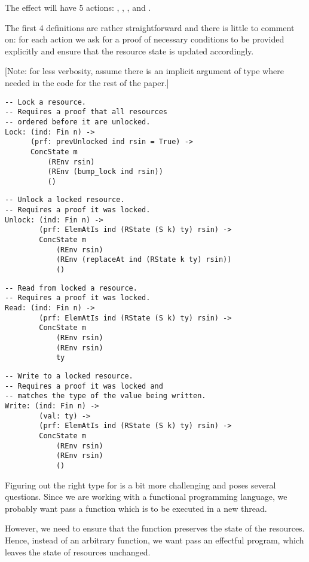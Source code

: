 The effect will have 5 actions: , , ,
 and .

The first 4 definitions are rather straightforward and there is little to
comment on: for each action we ask for a proof of necessary conditions to be
provided explicitly and ensure that the resource state is updated accordingly.

[Note: for less verbosity, assume there is an implicit argument  of
type  where needed in the code for the rest of the
paper.]

\begin{BVerbatim}
-- Lock a resource.
-- Requires a proof that all resources
-- ordered before it are unlocked.
Lock: (ind: Fin n) ->
      (prf: prevUnlocked ind rsin = True) ->
      ConcState m
          (REnv rsin)
          (REnv (bump_lock ind rsin))
          ()
\end{BVerbatim}

\begin{BVerbatim}
-- Unlock a locked resource.
-- Requires a proof it was locked.
Unlock: (ind: Fin n) ->
        (prf: ElemAtIs ind (RState (S k) ty) rsin) ->
        ConcState m
            (REnv rsin)
            (REnv (replaceAt ind (RState k ty) rsin))
            ()
\end{BVerbatim}

\begin{BVerbatim}
-- Read from locked a resource.
-- Requires a proof it was locked.
Read: (ind: Fin n) ->
        (prf: ElemAtIs ind (RState (S k) ty) rsin) ->
        ConcState m
            (REnv rsin)
            (REnv rsin)
            ty
\end{BVerbatim}

\begin{BVerbatim}
-- Write to a locked resource.
-- Requires a proof it was locked and
-- matches the type of the value being written.
Write: (ind: Fin n) ->
        (val: ty) ->
        (prf: ElemAtIs ind (RState (S k) ty) rsin) ->
        ConcState m
            (REnv rsin)
            (REnv rsin)
            ()

\end{BVerbatim}

Figuring out the right type for  is a bit more challenging and
poses several questions. Since we are working with a functional programming
language, we probably want pass a function which is to be executed in a new
thread.

However, we need to ensure that the function preserves the state of
the resources. Hence, instead of an arbitrary function, we want pass an
effectful program, which leaves the state of resources unchanged.

